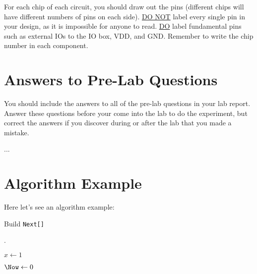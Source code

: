 \documentclass[a4paper]{article}
\begin{document}
    For each chip of each circuit, you should draw out the pins (different chips will have 
    different numbers of pins on each side). \underline{DO NOT} label every single pin in your design, 
    as it is impossible for anyone to read. \underline{DO} label fundamental pins such as external IOs to 
    the IO box, VDD, and GND. Remember to write the chip number in each component.

    \section{Answers to Pre-Lab Questions}
    You should include the answers to all of the pre-lab questions in your lab report. Answer 
    these questions before your come into the lab to do the experiment, but correct the 
    answers if you discover during or after the lab that you made a mistake.

    ... 

    

    \section{Algorithm Example}

    Here let's see an algorithm example:

    \begin{algorithm}
        \caption{Build \texttt{Next[]}}
        \label{alg-build-next}

        \Next.

        $x \gets 1$

        $\Now \gets 0$

    \end{algorithm}
\end{document}
